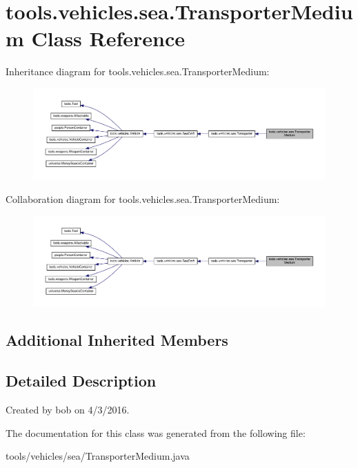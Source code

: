 \hypertarget{classtools_1_1vehicles_1_1sea_1_1_transporter_medium}{}\section{tools.\+vehicles.\+sea.\+Transporter\+Medium Class Reference}
\label{classtools_1_1vehicles_1_1sea_1_1_transporter_medium}


Inheritance diagram for tools.\+vehicles.\+sea.\+Transporter\+Medium\+:\nopagebreak
\begin{figure}[H]
\begin{center}
\leavevmode
\includegraphics[width=350pt]{classtools_1_1vehicles_1_1sea_1_1_transporter_medium__inherit__graph}
\end{center}
\end{figure}


Collaboration diagram for tools.\+vehicles.\+sea.\+Transporter\+Medium\+:\nopagebreak
\begin{figure}[H]
\begin{center}
\leavevmode
\includegraphics[width=350pt]{classtools_1_1vehicles_1_1sea_1_1_transporter_medium__coll__graph}
\end{center}
\end{figure}
\subsection*{Additional Inherited Members}


\subsection{Detailed Description}
Created by bob on 4/3/2016. 

The documentation for this class was generated from the following file\+:\begin{DoxyCompactItemize}
\item 
tools/vehicles/sea/Transporter\+Medium.\+java\end{DoxyCompactItemize}
